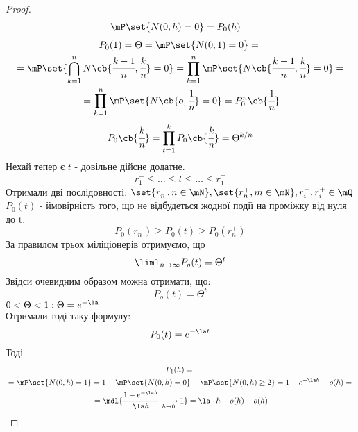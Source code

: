 \begin{proof}
	\begin{eqnarray}
		&\mP\set{N(0,h)=0}=P_0(h)
	\end{eqnarray}
	\begin{multline}
		P_0(1) = \Theta = \mP\set{N(0,1)=0}  ={}\\{}= \mP\set{\bigcap\limits_{k=1}^n N\cb{\cfrac{k-1}{n},\cfrac{k}{n}} = 0} = \prod\limits_{k=1}^n \mP\set{N\cb{\cfrac{k-1}{n},\cfrac{k}{n}}= 0} ={}\\{}= \prod\limits_{k=1}^n \mP\set{N\cb{o,\cfrac1n}=0} = P_0^n\cb{\cfrac1n} 
	\end{multline}
	\begin{equation}
		P_0\cb{\cfrac kn} = \prod\limits_{t=1}^k P_0\cb{\cfrac kn} = \Theta^{k/n}		
	\end{equation}
	Нехай тепер є $t$ - довільне дійсне додатне.
	\begin{equation}
		r_1^- \leq \ldots\leq t \leq \ldots \leq r_1^+
	\end{equation}
	Отримали дві послідовності: $\set{r_n^-,n\in \mN},\set{r_n^+,m\in \mN},r_i^-,r_i^+\in\mQ$\\
	$P_0(t)$ - ймовірність того, що не відбудеться жодної події на проміжку від нуля до t.\\
	\begin{equation}
		P_0(r_n^-) \geq P_0(t) \geq P_0(r_n^+)
	\end{equation}
	За правилом трьох міліціонерів отримуємо, що 
	\begin{equation}
		\liml_{n\to\infty} P_o(t) = \Theta^t
	\end{equation}
	Звідси очевидним образом можна отримати, що:
	\begin{equation}
		P_o(t) = \Theta^t
	\end{equation}
	$0<\Theta<1: \Theta = e^{-\la}$\\
	Отримали тоді таку формулу:
	\begin{equation}
		P_0(t) = e^{-\la t}
	\end{equation}
	Тоді 
	\begin{multline}
		P_1(h) = {} \\ {} = \mP\set{N(0,h)=1} = 1 - \mP\set{N(0,h)=0} - \mP\set{N(0,h)\geq 2} = 1 - e^{-\la h} - o(h) = {} \\ {} = \mdl{\cfrac{1-e^{-\la h}}{\la h} \xrightarrow[h\to0]{} 1 } = \la \cdot h + o(h) - o(h)
	\end{multline}
\end{proof}
